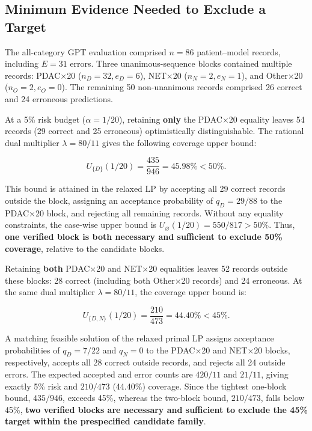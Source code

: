 \documentclass[letterpaper]{article}
\begin{document}
\subsection{Minimum Evidence Needed to Exclude a Target}

The all-category GPT evaluation comprised \(n=86\) patient--model records, including \(E=31\) errors. Three unanimous-sequence blocks contained multiple records: PDAC$\times$20 (\(n_D=32,e_D=6\)), NET$\times$20 (\(n_N=2,e_N=1\)), and Other$\times$20 (\(n_O=2,e_O=0\)). The remaining 50 non-unanimous records comprised 26 correct and 24 erroneous predictions.

At a 5\% risk budget (\(\alpha=1/20\)), retaining \textbf{only} the PDAC$\times$20 equality leaves 54 records (29 correct and 25 erroneous) optimistically distinguishable. The rational dual multiplier \(\lambda=80/11\) gives the following coverage upper bound:

\[
U_{\{D\}}(1/20)=\frac{435}{946}=45.98\%<50\%.
\]

This bound is attained in the relaxed LP by accepting all 29 correct records outside the block, assigning an acceptance probability of \(q_D=29/88\) to the PDAC$\times$20 block, and rejecting all remaining records. Without any equality constraints, the case-wise upper bound is \(U_{\varnothing}(1/20)=550/817>50\%\). Thus, \textbf{one verified block is both necessary and sufficient to exclude 50\% coverage}, relative to the candidate blocks.

Retaining \textbf{both} PDAC$\times$20 and NET$\times$20 equalities leaves 52 records outside these blocks: 28 correct (including both Other$\times$20 records) and 24 erroneous. At the same dual multiplier \(\lambda=80/11\), the coverage upper bound is:

\[
U_{\{D,N\}}(1/20)=\frac{210}{473}=44.40\%<45\%.
\]

A matching feasible solution of the relaxed primal LP assigns acceptance probabilities of \(q_D=7/22\) and \(q_N=0\) to the PDAC$\times$20 and NET$\times$20 blocks, respectively, accepts all 28 correct outside records, and rejects all 24 outside errors. The expected accepted and error counts are \(420/11\) and \(21/11\), giving exactly 5\% risk and \(210/473\) (44.40\%) coverage. Since the tightest one-block bound, \(435/946\), exceeds 45\%, whereas the two-block bound, \(210/473\), falls below 45\%, \textbf{two verified blocks are necessary and sufficient to exclude the 45\% target within the prespecified candidate family}.
\end{document}
